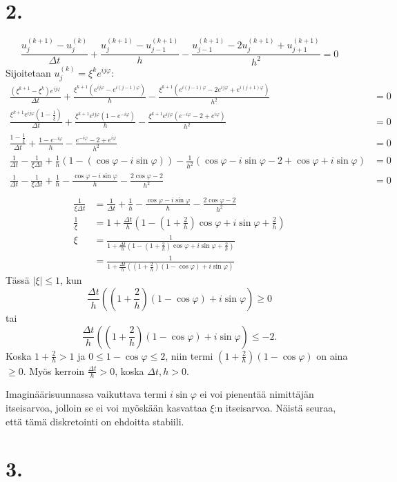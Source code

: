 \documentclass{article}
\begin{document}
\newpage
\section*{2.}

\[
  \frac{u_j^{(k+1)} - u_j^{(k)}}{\Delta t} + \frac{u_j^{(k+1)} - u_{j-1}^{(k+1)}}{h}
  - \frac{u_{j-1}^{(k+1)} - 2u_j^{(k+1)} + u_{j+1}^{(k+1)}}{h^2} = 0
\]
Sijoitetaan $u_j^{(k)} = \xi^k e^{ij\varphi}$:
\begin{align*}
  \frac{(\xi^{k+1} - \xi^k)e^{ij\varphi}}{\Delta t}
  + \frac{\xi^{k+1}(e^{ij\varphi} - e^{i(j-1)\varphi})}{h}
  - \frac{\xi^{k+1}(e^{i(j-1)\varphi} - 2e^{ij\varphi} + e^{i(j+1)\varphi})}{h^2} &= 0 \\
  \frac{\xi^{k+1}e^{ij\varphi}(1 - \frac{1}{\xi})}{\Delta t}
  + \frac{\xi^{k+1}e^{ij\varphi}(1 - e^{-i\varphi})}{h}
  - \frac{\xi^{k+1}e^{ij\varphi}(e^{-i\varphi} - 2 + e^{i\varphi})}{h^2} &= 0 \\
  \frac{1 - \frac{1}{\xi}}{\Delta t} + \frac{1 - e^{-i\varphi}}{h}
  - \frac{e^{-i\varphi} - 2 + e^{i\varphi}}{h^2} &= 0 \\
  \frac{1}{\Delta t} - \frac{1}{\xi\Delta t}
  + \frac{1}{h}(1 - (\cos\varphi - i\sin\varphi))
  - \frac{1}{h^2}(\cos\varphi - i\sin\varphi - 2 + \cos\varphi + i\sin\varphi) &= 0 \\
  \frac{1}{\Delta t} - \frac{1}{\xi\Delta t}
  + \frac{1}{h} - \frac{\cos\varphi - i\sin\varphi}{h}
  - \frac{2\cos\varphi - 2}{h^2} &= 0 \\
\end{align*}
\begin{align*}
  \frac{1}{\xi\Delta t} &= \frac{1}{\Delta t} + \frac{1}{h}
  - \frac{\cos\varphi - i\sin\varphi}{h} - \frac{2\cos\varphi - 2}{h^2} \\
  \frac{1}{\xi} &= 1 + \frac{\Delta t}{h} (1 - (1 + \frac{2}{h})\cos\varphi + i\sin\varphi + \frac{2}{h}) \\
  \xi &= \frac{1}{1 + \frac{\Delta t}{h} (1 - (1 + \frac{2}{h})\cos\varphi + i\sin\varphi + \frac{2}{h})} \\
      &= \frac{1}{1 + \frac{\Delta t}{h} ((1 + \frac{2}{h})(1 - \cos\varphi) + i\sin\varphi)}
\end{align*}
Tässä $|\xi| \leq 1$, kun
\[
  \frac{\Delta t}{h} ((1 + \frac{2}{h})(1 - \cos\varphi) + i\sin\varphi) \geq 0
\]
tai
\[
  \frac{\Delta t}{h} ((1 + \frac{2}{h})(1 - \cos\varphi) + i\sin\varphi) \leq -2.
\]
Koska $1 + \frac{2}{h} > 1$ ja $0 \leq 1 - \cos\varphi \leq 2$, niin termi
$(1 + \frac{2}{h})(1 - \cos\varphi)$ on aina $\geq 0$.
Myös kerroin $\frac{\Delta t}{h} > 0$, koska $\Delta t, h > 0$.

Imaginäärisuunnassa vaikuttava termi $i\sin\varphi$ ei voi pienentää nimittäjän
itseisarvoa, jolloin se ei voi myöskään kasvattaa $\xi$:n itseisarvoa.  Näistä
seuraa, että tämä diskretointi on ehdoitta stabiili.

\newpage
\section*{3.}
\end{document}
